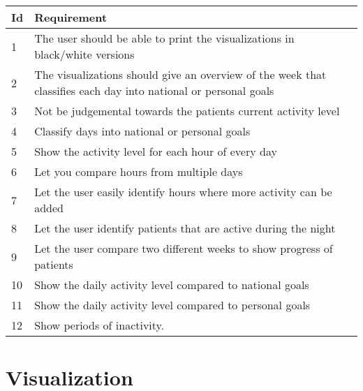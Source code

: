 \begin{table}[h!]
  \begin{center}
  \begin{tabular}{|l|p{12cm}|}
    \hline
      \textbf{Id} & \textbf{Requirement} \\ \hline
      1  & The user should be able to print the visualizations in black/white versions \\ \hline
      2  & The visualizations should give an overview of the week that classifies each day into national or personal goals \\ \hline
      3  & Not be judgemental towards the patients current activity level \\ \hline
      4  & Classify days into national or personal goals \\ \hline
      5  & Show the activity level for each hour of every day \\ \hline
      6  & Let you compare hours from multiple days \\ \hline
      7  & Let the user easily identify hours where more activity can be added \\ \hline
      8  & Let the user identify patients that are active during the night \\ \hline
      9  & Let the user compare two different weeks to show progress of patients \\ \hline
      10 & Show the daily activity level compared to national goals \\ \hline
      11 & Show the daily activity level compared to personal goals \\ \hline 
      12 & Show periods of inactivity.
  \end{tabular}
  \end{center}
\end{table}
 
\section{Visualization}


